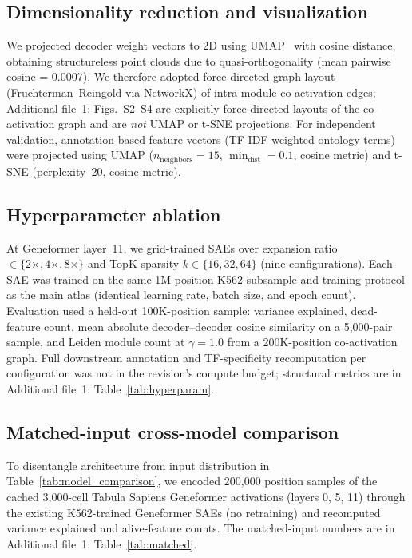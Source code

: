 \documentclass[onecolumn]{article}
\begin{document}
\subsection{Dimensionality reduction and visualization}

We projected decoder weight vectors to 2D using UMAP~\cite{mcinnes2018umap} with cosine distance, obtaining structureless point clouds due to quasi-orthogonality (mean pairwise cosine = 0.0007). We therefore adopted force-directed graph layout (Fruchterman--Reingold via NetworkX) of intra-module co-activation edges; Additional file~1: Figs.~S2--S4 are explicitly force-directed layouts of the co-activation graph and are \emph{not} UMAP or t-SNE projections. For independent validation, annotation-based feature vectors (TF-IDF weighted ontology terms) were projected using UMAP ($n_\text{neighbors}=15$, $\min_\text{dist}=0.1$, cosine metric) and t-SNE (perplexity~20, cosine metric).

\subsection{Hyperparameter ablation}

At Geneformer layer~11, we grid-trained SAEs over expansion ratio $\in \{2\times, 4\times, 8\times\}$ and TopK sparsity $k \in \{16, 32, 64\}$ (nine configurations). Each SAE was trained on the same 1M-position K562 subsample and training protocol as the main atlas (identical learning rate, batch size, and epoch count). Evaluation used a held-out 100K-position sample: variance explained, dead-feature count, mean absolute decoder--decoder cosine similarity on a 5{,}000-pair sample, and Leiden module count at $\gamma{=}1.0$ from a 200K-position co-activation graph. Full downstream annotation and TF-specificity recomputation per configuration was not in the revision's compute budget; structural metrics are in Additional file~1: Table~\ref{tab:hyperparam}.

\subsection{Matched-input cross-model comparison}

To disentangle architecture from input distribution in Table~\ref{tab:model_comparison}, we encoded 200{,}000 position samples of the cached 3{,}000-cell Tabula Sapiens Geneformer activations (layers 0, 5, 11) through the existing K562-trained Geneformer SAEs (no retraining) and recomputed variance explained and alive-feature counts. The matched-input numbers are in Additional file~1: Table~\ref{tab:matched}.
\end{document}
